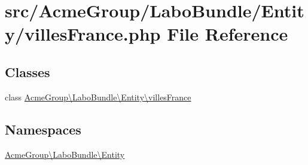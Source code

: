 \hypertarget{villes_france_8php}{\section{src/\+Acme\+Group/\+Labo\+Bundle/\+Entity/villes\+France.php File Reference}
\label{villes_france_8php}
}
\subsection*{Classes}
\begin{DoxyCompactItemize}
\item 
class \hyperlink{class_acme_group_1_1_labo_bundle_1_1_entity_1_1villes_france}{Acme\+Group\textbackslash{}\+Labo\+Bundle\textbackslash{}\+Entity\textbackslash{}villes\+France}
\end{DoxyCompactItemize}
\subsection*{Namespaces}
\begin{DoxyCompactItemize}
\item 
 \hyperlink{namespace_acme_group_1_1_labo_bundle_1_1_entity}{Acme\+Group\textbackslash{}\+Labo\+Bundle\textbackslash{}\+Entity}
\end{DoxyCompactItemize}
